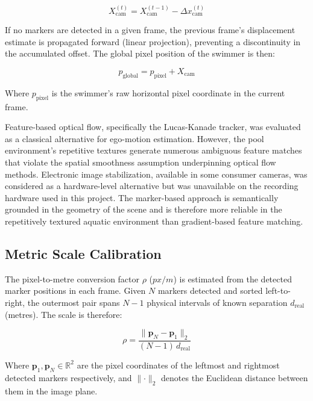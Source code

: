 \begin{equation}
    X_{\text{cam}}^{(t)} = X_{\text{cam}}^{(t-1)} - \Delta x_{\text{cam}}^{(t)}
\end{equation}

If no markers are detected in a given frame, the previous frame's displacement estimate is
propagated forward (linear projection), preventing a discontinuity in the accumulated offset.
The global pixel position of the swimmer is then:

\begin{equation}
    p_{\text{global}} = p_{\text{pixel}} + X_{\text{cam}}
\end{equation}

Where $p_{\text{pixel}}$ is the swimmer's raw horizontal pixel coordinate in the current frame.

Feature-based optical flow, specifically the Lucas-Kanade tracker, was evaluated as a
classical alternative for ego-motion estimation. However, the pool environment's repetitive
textures generate numerous ambiguous feature matches that violate the spatial smoothness assumption
underpinning optical flow methods. Electronic image stabilization, available in some consumer
cameras, was considered as a hardware-level alternative but was unavailable on the recording
hardware used in this project. The marker-based approach is semantically grounded in the
geometry of the scene and is therefore more reliable in the repetitively textured aquatic
environment than gradient-based feature matching.

\subsection{Metric Scale Calibration}

The pixel-to-metre conversion factor $\rho$ ($px/m$) is estimated from the detected marker
positions in each frame. Given $N$ markers detected and sorted left-to-right, the outermost
pair spans $N-1$ physical intervals of known separation $d_{\text{real}}$ (metres). The scale
is therefore:

\begin{equation}
    \rho = \frac{\lVert \mathbf{p}_N - \mathbf{p}_1 \rVert_2}{(N-1)\, d_{\text{real}}}
\end{equation}

\noindent Where $\mathbf{p}_1, \mathbf{p}_N \in \mathbb{R}^2$ are the pixel coordinates of the
leftmost and rightmost detected markers respectively, and $\lVert \cdot \rVert_2$ denotes the
Euclidean distance between them in the image plane.

